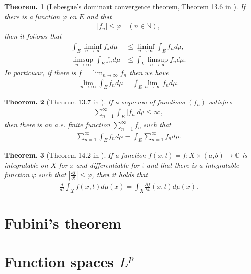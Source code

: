 \documentclass[openany, a4paper, oneside]{book}
\theoremstyle{break}
\newtheorem{thm}{Theorem.}[section]
\theoremstyle{breakdefn}
\newcommand{\abs}[1]{\left|#1\right|}
\newcommand{\rbk}[1]{\left (#1\right)}
\newcommand{\bbC}{\mathbb{C}}
\newcommand{\bbN}{\mathbb{N}}
\newcommand{\dmu}{d \mu}
\begin{document}
\begin{thm}[Lebesgue's dominant convergence theorem, Theorem 13.6 in \cite{SeizoIto1}]
 If there is a function $\varphi$ on $E$ and that
 \begin{align}
  \abs{f_n} \leq \varphi \quad \rbk{n \in \bbN},
 \end{align}
 then it follows that
 \begin{align}
  \int_E \liminf_{n \to \infty} f_n \dmu
  &\leq
  \liminf_{n \to \infty} \int_E f_n \dmu, \\
  \limsup_{n \to \infty} \int_E f_n \dmu
  &\leq
  \int_E \limsup_{n \to \infty} f_n \dmu.
 \end{align}
 In particular, if there is $f = \lim_{n \to \infty} f_n$ then we have
 \begin{align}
  \lim_{n \to \infty} \int_E f_n \dmu
  =
  \int_E \lim_{n \to \infty} f_n \dmu.
 \end{align}
\end{thm}
\begin{thm}[Theorem 13.7 in \cite{SeizoIto1}]
 If a sequence of functions $(f_n)$ satisfies
 \begin{align}
  \sum_{n=1}^{\infty} \int_E \abs{f_n} \dmu
  \leq
  \infty,
 \end{align}
 then there is an a.e. finite function $\sum_{n=1}^{\infty} f_n$ such that
 \begin{align}
  \sum_{n=1}^{\infty} \int_E f_n \dmu
  =
  \int_E \sum_{n=1}^{\infty} f_n \dmu.
 \end{align}
\end{thm}
\begin{thm}[Theorem 14.2 in \cite{SeizoIto1}]
 If a function $f (x,t) = f \colon X \times \rbk{a, b} \to \bbC$ is integralable on $X$ for $x$ and differentiable for $t$
 and that there is a integralable function $\varphi$ such that $\abs{\frac{\partial f}{\partial t}} \leq \varphi$,
 then it holds that
 \begin{align}
  \frac{d}{dt} \int_X f (x, t) \dmu (x)
  =
  \int_X \frac{\partial f}{\partial t} (x, t) \dmu (x).
 \end{align}
\end{thm}
\section{Fubini's theorem}
\label{sec-7-1-8}
\section{Function spaces $L^p$}
\label{sec-7-1-9}
\end{document}
